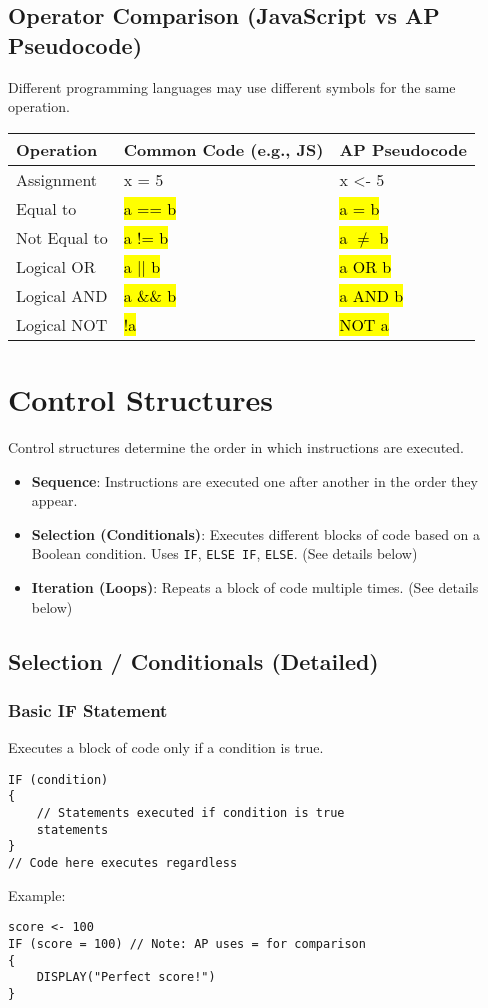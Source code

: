 \documentclass[11pt,oneside]{book}
\newcommand{\hlc}[2][hlyellow]{\sethlcolor{#1}\hl{#2}}
\begin{document}
\subsection*{Operator Comparison (JavaScript vs AP Pseudocode)}
Different programming languages may use different symbols for the same operation.

\begin{tabularx}{\textwidth}{l >{\ttfamily}l >{\ttfamily}l}
\toprule
\textbf{Operation} & \textbf{Common Code (e.g., JS)} & \textbf{AP Pseudocode} \\
\midrule
Assignment & x = 5 & x <- 5 \\
Equal to & \hlc[hlyellow]{a == b} & \hlc[hlyellow]{a = b} \\
Not Equal to & \hlc[hlyellow]{a != b} & \hlc[hlyellow]{a $\neq$ b} \\
Logical OR & \hlc[hlred]{a || b} & \hlc[hlred]{a OR b} \\
Logical AND & \hlc[hlred]{a \&\& b} & \hlc[hlred]{a AND b} \\
Logical NOT & \hlc[hlred]{!a} & \hlc[hlred]{NOT a} \\
\bottomrule
\end{tabularx}

\section{Control Structures}
\label{sec:control_structures}
Control structures determine the order in which instructions are executed.
\begin{itemize}
    \item \textbf{Sequence}: Instructions are executed one after another in the order they appear.
    \item \textbf{Selection (Conditionals)}: Executes different blocks of code based on a Boolean condition. Uses \texttt{IF}, \texttt{ELSE IF}, \texttt{ELSE}. (See details below)
    \item \textbf{Iteration (Loops)}: Repeats a block of code multiple times. (See details below)
\end{itemize}

\subsection*{Selection / Conditionals (Detailed)}

\subsubsection*{Basic IF Statement}
Executes a block of code only if a condition is true.
\begin{lstlisting}[language=APCSP, label={lst:basic_if}, caption={AP Pseudocode: Basic IF}]
IF (condition)
{
    // Statements executed if condition is true
    statements
}
// Code here executes regardless
\end{lstlisting}
Example:
\begin{lstlisting}[language=APCSP]
score <- 100
IF (score = 100) // Note: AP uses = for comparison
{
    DISPLAY("Perfect score!")
}
\end{lstlisting}
\end{document}
